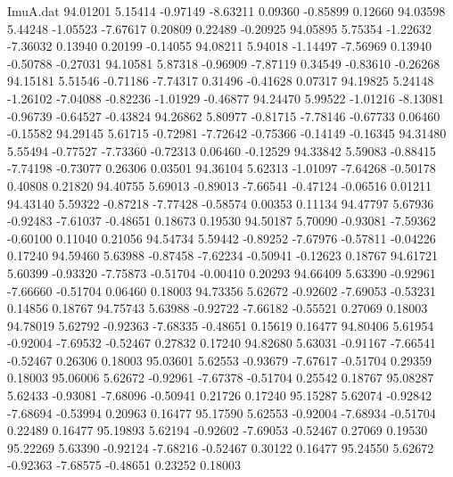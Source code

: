 \begin{filecontents}{ImuA.dat}
  94.01201    5.15414   -0.97149   -8.63211    0.09360   -0.85899    0.12660
  94.03598    5.44248   -1.05523   -7.67617    0.20809    0.22489   -0.20925
  94.05895    5.75354   -1.22632   -7.36032    0.13940    0.20199   -0.14055
  94.08211    5.94018   -1.14497   -7.56969    0.13940   -0.50788   -0.27031
  94.10581    5.87318   -0.96909   -7.87119    0.34549   -0.83610   -0.26268
  94.15181    5.51546   -0.71186   -7.74317    0.31496   -0.41628    0.07317
  94.19825    5.24148   -1.26102   -7.04088   -0.82236   -1.01929   -0.46877
  94.24470    5.99522   -1.01216   -8.13081   -0.96739   -0.64527   -0.43824
  94.26862    5.80977   -0.81715   -7.78146   -0.67733    0.06460   -0.15582
  94.29145    5.61715   -0.72981   -7.72642   -0.75366   -0.14149   -0.16345
  94.31480    5.55494   -0.77527   -7.73360   -0.72313    0.06460   -0.12529
  94.33842    5.59083   -0.88415   -7.74198   -0.73077    0.26306    0.03501
  94.36104    5.62313   -1.01097   -7.64268   -0.50178    0.40808    0.21820
  94.40755    5.69013   -0.89013   -7.66541   -0.47124   -0.06516    0.01211
  94.43140    5.59322   -0.87218   -7.77428   -0.58574    0.00353    0.11134
  94.47797    5.67936   -0.92483   -7.61037   -0.48651    0.18673    0.19530
  94.50187    5.70090   -0.93081   -7.59362   -0.60100    0.11040    0.21056
  94.54734    5.59442   -0.89252   -7.67976   -0.57811   -0.04226    0.17240
  94.59460    5.63988   -0.87458   -7.62234   -0.50941   -0.12623    0.18767
  94.61721    5.60399   -0.93320   -7.75873   -0.51704   -0.00410    0.20293
  94.66409    5.63390   -0.92961   -7.66660   -0.51704    0.06460    0.18003
  94.73356    5.62672   -0.92602   -7.69053   -0.53231    0.14856    0.18767
  94.75743    5.63988   -0.92722   -7.66182   -0.55521    0.27069    0.18003
  94.78019    5.62792   -0.92363   -7.68335   -0.48651    0.15619    0.16477
  94.80406    5.61954   -0.92004   -7.69532   -0.52467    0.27832    0.17240
  94.82680    5.63031   -0.91167   -7.66541   -0.52467    0.26306    0.18003
  95.03601    5.62553   -0.93679   -7.67617   -0.51704    0.29359    0.18003
  95.06006    5.62672   -0.92961   -7.67378   -0.51704    0.25542    0.18767
  95.08287    5.62433   -0.93081   -7.68096   -0.50941    0.21726    0.17240
  95.15287    5.62074   -0.92842   -7.68694   -0.53994    0.20963    0.16477
  95.17590    5.62553   -0.92004   -7.68934   -0.51704    0.22489    0.16477
  95.19893    5.62194   -0.92602   -7.69053   -0.52467    0.27069    0.19530
  95.22269    5.63390   -0.92124   -7.68216   -0.52467    0.30122    0.16477
  95.24550    5.62672   -0.92363   -7.68575   -0.48651    0.23252    0.18003

\end{filecontents}
